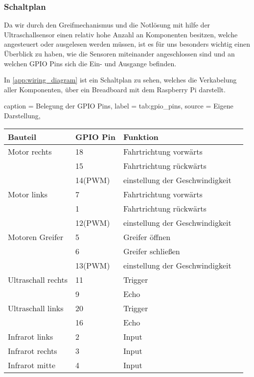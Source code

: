 
\subsubsection{Schaltplan}
Da wir durch den Greifmechanismus und die Notlösung mit hilfe der Ultraschallsensor einen relativ hohe Anzahl an Komponenten besitzen, welche angesteuert oder ausgelesen werden müssen, ist es für uns besonders wichtig einen Überblick zu haben, wie die Sensoren miteinander angeschlossen sind und an welchen GPIO Pins sich die Ein- und Ausgange befinden.

In \autoref{app:wiring_diagram} ist ein Schaltplan zu sehen, welches die Verkabelung aller Komponenten, über ein Breadboard mit dem Raspberry Pi darstellt.

\begin{dhbwtable}{%
    caption	= Belegung der GPIO Pins,
    label	= tab:gpio_pins,
    source	= Eigene Darstellung,
}
    \begin{tabular}{llll}
        \toprule
        \textbf{Bauteil}    & \textbf{GPIO Pin}     &\textbf{Funktion}   \\\midrule
        Motor rechts   	    & 18                    & Fahrtrichtung vorwärts\\
                            & 15                    & Fahrtrichtung rückwärts \\
                            & 14(PWM)               & einstellung der Geschwindigkeit\\
        Motor links   	    & 7                     & Fahrtrichtung vorwärts\\
                            & 1                     & Fahrtrichtung rückwärts \\
                            & 12(PWM)               & einstellung der Geschwindigkeit\\    
        Motoren Greifer   	& 5                     & Greifer öffnen\\
                            & 6                     & Greifer schließen \\
                            & 13(PWM)               & einstellung der Geschwindigkeit\\
        Ultraschall rechts 	& 11                    & Trigger\\
                            & 9                     & Echo \\
        Ultraschall links   & 20                    & Trigger\\
                            & 16                    & Echo \\ 
        Infrarot links      & 2                     & Input\\
        Infrarot rechts     & 3                     & Input\\
        Infrarot mitte      & 4                     & Input\\        
   \bottomrule
    \end{tabular}    
\end{dhbwtable}


